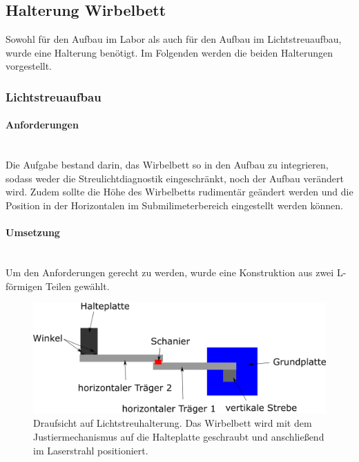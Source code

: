 \newpage

\subsection{Halterung Wirbelbett}

Sowohl für den Aufbau im Labor als auch für den Aufbau im Lichtstreuaufbau, wurde eine Halterung benötigt. Im Folgenden werden die beiden Halterungen vorgestellt.

\subsubsection{Lichtstreuaufbau}


\paragraph{Anforderungen}

\hfill \\
Die Aufgabe bestand darin, das Wirbelbett so in den Aufbau zu integrieren, sodass weder die Streulichtdiagnostik eingeschränkt, noch der Aufbau verändert wird. Zudem sollte die Höhe des Wirbelbetts rudimentär geändert werden und die Position in der Horizontalen im Submilimeterbereich eingestellt werden können. 


\paragraph{Umsetzung}
\hfill \\
Um den Anforderungen gerecht zu werden, wurde eine Konstruktion aus zwei L-förmigen Teilen gewählt. 

\begin{figure}[h!]
		\centering
		\includegraphics[scale=1.1]{Halterung_Lichtstreu_Vogel.png}
		\caption[Haltearm Lichtstreuaufbau Draufsicht]{Draufsicht auf Lichtstreuhalterung. Das Wirbelbett wird mit dem Justiermechanismus auf die Halteplatte geschraubt und anschließend im Laserstrahl positioniert.}
\end{figure}

